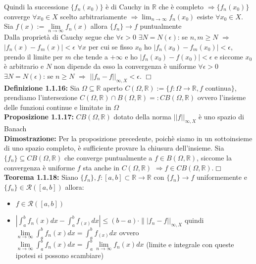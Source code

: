\documentclass[a4paper,11pt,titlepage]{book}
\begin{document}
Quindi la successione $\{f_{n}(x_0)\}$ è di Cauchy in $\mathbb{R}$ che è completo $\Rightarrow\{f_{n}(x_0)\}$  converge $\forall{x_{0}}\in{X}$ scelto arbitrariamente  $\Rightarrow \lim_{n \to \infty}f_{n}(x_0)$ esiste $\forall{x_{0}}\in{X}$. Sia $f(x):=\lim\limits_{n \to \infty}{f_{n}}(x)$ allora $\{f_{n}\}\rightarrow f$ puntualmente\\

Dalla proprietà di Cauchy segue che $\forall{\epsilon}>0$ $\exists{N}=N(\epsilon)$: se $n,m\geq{N}$ $\Rightarrow$ $|f_{n}(x)-f_{m}(x)|<\epsilon$  $\forall{x}$ per cui se fisso $x_0$ ho $|f_{n}(x_0)-f_{m}(x_0)|<\epsilon$, prendo il limite per $m$ che tende a $+\infty$ e ho $|f_{n}(x_0)-f(x_0)|<\epsilon$ e siccome $x_0$ è arbitrario e $N$ non dipende da esso la convergenza è uniforme $\forall{\epsilon{>0}}$ $\exists{N}=N(\epsilon)$: se $n\geq{N}$ $\Rightarrow$ $||f_{n}-f||_{\infty,X}<\epsilon$. $\Box$\\

\textbf{Definizione 1.1.16:} Sia $\Omega \subseteq \mathbb{R}$ aperto $C(\Omega,\mathbb{R}):=\{f:\Omega\rightarrow\mathbb{R}, f$ continua$\}$, prendiamo l'intersezione $C(\Omega,\mathbb{R})\cap B(\Omega,\mathbb{R})=:CB(\Omega,\mathbb{R})$ ovvero l'insieme delle funzioni continue e limitate in $\Omega$\\

\textbf{Proposizione 1.1.17:} $CB(\Omega,\mathbb{R})$ dotato della norma $||f||_{\infty,X}$ è uno spazio di Banach\\

\textbf{Dimostrazione:} Per la proposizione precedente, poichè siamo in un sottoinsieme di uno spazio completo, è sufficiente provare la chiusura dell'insieme. Sia $\{f_{n}\}\subseteq CB(\Omega,\mathbb{R})$ che converge puntualmente a $f\in B(\Omega,\mathbb{R})$, siccome la convergenza è uniforme $f$ sta anche in $C(\Omega,\mathbb{R})$ $\Rightarrow f \in CB(\Omega,\mathbb{R})$.$\Box$\\

\textbf{Teorema 1.1.18:} Siano $\{f_{n}\},f:[a,b]\subset\mathbb{R}\rightarrow\mathbb{R}$ con $\{f_{n}\}\rightarrow f$ uniformemente e  $\{f_{n}\}\in\mathcal{R}([a,b])$ allora:
\begin{itemize}
\item $f\in \mathcal{R}([a,b])$
\item $|\int_{a}^{b}f_{n}(x)dx-\int_{a}^{b}f_(x)dx|\leq (b-a)\cdot\||f_{n}-f||_{\infty,X}$ quindi $\lim\limits_{n \to \infty}\int_{a}^{b}f_{n}(x)dx=\int_{a}^{b}f_(x)dx$ ovvero $\lim\limits_{n \to \infty}\int_{a}^{b}f_{n}(x)dx=\int_{a}^{b}\lim\limits_{n \to \infty}{f_{n}(x)}dx$ (limite e integrale con queste ipotesi si possono scambiare) \\
\end{itemize}
\end{document}
